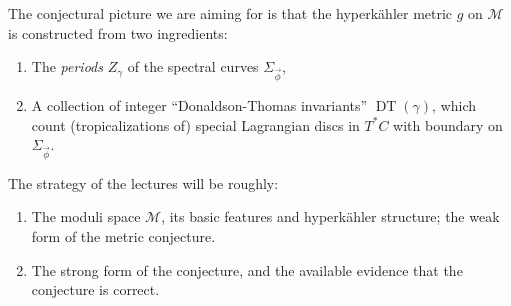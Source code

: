 \documentclass[12pt,letterpaper,reqno]{article}
\numberwithin{equation}{section}
\newcommand{\cM}{\ensuremath{\mathcal M}}
\newcommand{\hk}{hyperk\"ahler\xspace}
\newcommand{\e}{{\mathrm e}}
\newcommand{\sing}{\mathrm{sing}}
\newcommand{\reg}{\mathrm{reg}}
\renewcommand{\sf}{\mathrm{sf}}
\newcommand{\vphi}{{\vec\phi}}
\newcommand{\ti}[1]{\textit{#1}}
\DeclareMathOperator{\DT}{DT}
\newcommand{\insfig}[2]{

\medskip
\noindent
\begin{minipage}{\linewidth}

\makebox[\linewidth]{\texttt{[image: figures/\#1-crop.pdf]}}

\end{minipage}
\medskip

}
\begin{document}
The conjectural picture we are aiming for is that the \hk metric
$g$ on $\cM$ is constructed from two ingredients:
\begin{enumerate}
  \item The \ti{periods} $Z_\gamma$ of the spectral curves $\Sigma_\vphi$,
  \item A collection of integer ``Donaldson-Thomas invariants''
  $\DT(\gamma)$,
  which count (tropicalizations of) special Lagrangian discs
  in $T^*C$ with boundary on $\Sigma_\vphi$.
\end{enumerate}



The strategy of the lectures will be roughly:
\begin{enumerate}
  \item The moduli space $\cM$, its basic features and \hk structure; the weak form of the metric conjecture.
  \item The strong form of the conjecture, and the available evidence that the conjecture is correct.
\end{enumerate}
\end{document}

